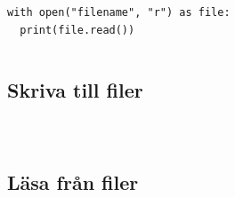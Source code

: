 
\begin{frame}[fragile]
  \begin{verbatim}
with open("filename", "r") as file:
  print(file.read())
  \end{verbatim}
\end{frame}

\begin{frame}[fragile]
  \begin{example}
    \inputminted[firstline=17,lastline=27,firstnumber=17]{python}{examples/open_close.py}
  \end{example}
\end{frame}

\subsection{Skriva till filer}

\begin{frame}[fragile]
  \begin{example}
    \inputminted[firstline=3,lastline=10,firstnumber=3]{python}{examples/write_file.py}
  \end{example}
\end{frame}

\begin{frame}[fragile]
  \begin{example}
    \inputminted[firstline=12,lastline=19,firstnumber=12]{python}{examples/write_file.py}
  \end{example}
\end{frame}

\begin{frame}[fragile]
  \begin{example}
    \inputminted[firstline=20,lastline=26,firstnumber=20]{python}{examples/write_file.py}
  \end{example}
\end{frame}

\subsection{Läsa från filer}

